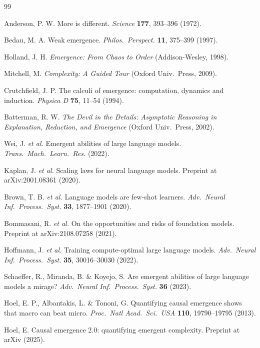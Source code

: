 \documentclass[11pt]{article}
\theoremstyle{definition}
\begin{document}
\clearpage
\begin{thebibliography}{99}\small

 Anderson, P. W. More is different.
\emph{Science} \textbf{177}, 393--396 (1972).

 Bedau, M. A. Weak emergence.
\emph{Philos.\ Perspect.} \textbf{11}, 375--399 (1997).

 Holland, J. H. \emph{Emergence: From Chaos to
Order} (Addison-Wesley, 1998).

 Mitchell, M. \emph{Complexity: A Guided Tour}
(Oxford Univ.\ Press, 2009).

 Crutchfield, J. P. The calculi of emergence:
computation, dynamics and induction. \emph{Physica D} \textbf{75},
11--54 (1994).

 Batterman, R. W. \emph{The Devil in the
Details: Asymptotic Reasoning in Explanation, Reduction, and Emergence}
(Oxford Univ.\ Press, 2002).

 Wei, J. \emph{et al.} Emergent abilities of large
language models. \emph{Trans.\ Mach.\ Learn.\ Res.} (2022).

 Kaplan, J. \emph{et al.} Scaling laws for neural
language models. Preprint at arXiv:2001.08361 (2020).

 Brown, T. B. \emph{et al.} Language models are
few-shot learners. \emph{Adv.\ Neural Inf.\ Process.\ Syst.}
\textbf{33}, 1877--1901 (2020).

 Bommasani, R. \emph{et al.} On the
opportunities and risks of foundation models. Preprint at
arXiv:2108.07258 (2021).

 Hoffmann, J. \emph{et al.} Training
compute-optimal large language models. \emph{Adv.\ Neural Inf.\
Process.\ Syst.} \textbf{35}, 30016--30030 (2022).

 Schaeffer, R., Miranda, B. \& Koyejo, S. Are
emergent abilities of large language models a mirage?
\emph{Adv.\ Neural Inf.\ Process.\ Syst.} \textbf{36} (2023).

 Hoel, E. P., Albantakis, L. \& Tononi, G.
Quantifying causal emergence shows that macro can beat micro.
\emph{Proc.\ Natl Acad.\ Sci.\ USA} \textbf{110}, 19790--19795
(2013).

 Hoel, E. Causal emergence 2.0: quantifying emergent
complexity. Preprint at arXiv (2025).


\end{thebibliography}
\end{document}
